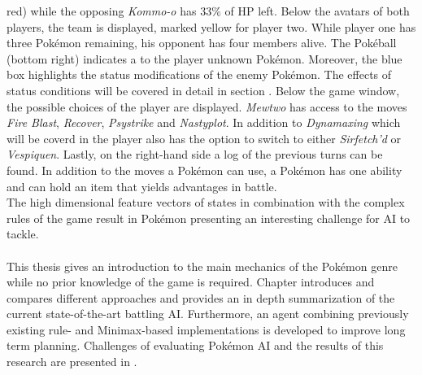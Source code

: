 red) while the opposing \textit{Kommo-o} has 33\% of \ac{HP} left. Below the avatars of both players,
the team is displayed, marked yellow for player two. While player one has three Pokémon remaining,
his opponent has four members alive. The Pokéball (bottom right) indicates a to the player unknown Pokémon.
Moreover, the blue box highlights the status modifications of the enemy Pokémon. The effects of status conditions
will be covered in detail in section . Below the game window, the possible choices of the
player are displayed. \textit{Mewtwo} has access to the moves \textit{Fire Blast}, \textit{Recover}, \textit{Psystrike}
and \textit{Nastyplot}. In addition to \textit{Dynamaxing} which will be coverd in  the player
also has the option to switch to either \textit{Sirfetch'd} or \textit{Vespiquen}. Lastly,
on the right-hand side a log of the previous turns can be found. In addition to the moves a Pokémon can use,
a Pokémon has one ability and can hold an item that yields advantages in battle. \\
The high dimensional feature vectors of states in combination with the complex rules of the game result in Pokémon 
presenting an interesting challenge for AI to tackle. \\
\\
This thesis gives an introduction to the main mechanics of the Pokémon genre while no prior knowledge of the 
game is required. 
Chapter  introduces and compares different approaches and provides an in depth summarization
of the current state-of-the-art battling AI. 
Furthermore, an agent combining previously existing rule- and 
Minimax-based implementations is developed to improve long term planning.
Challenges of evaluating Pokémon AI and the results of this research
are presented in .
